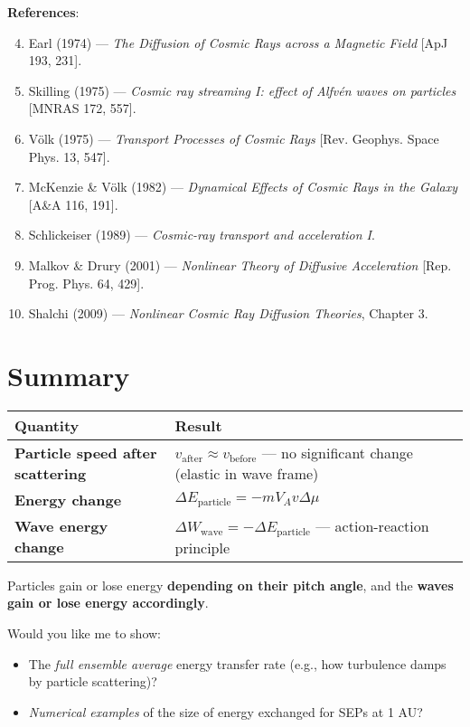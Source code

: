 \medskip
\noindent
\textbf{References}:
\begin{enumerate}
    \setcounter{enumi}{3}
    \item Earl (1974) --- \textit{The Diffusion of Cosmic Rays across a Magnetic Field} [ApJ 193, 231].
    \item Skilling (1975) --- \textit{Cosmic ray streaming I: effect of Alfvén waves on particles} [MNRAS 172, 557].
    \item Völk (1975) --- \textit{Transport Processes of Cosmic Rays} [Rev. Geophys. Space Phys. 13, 547].
    \item McKenzie \& Völk (1982) --- \textit{Dynamical Effects of Cosmic Rays in the Galaxy} [A\&A 116, 191].
    \item Schlickeiser (1989) --- \textit{Cosmic-ray transport and acceleration I}.
    \item Malkov \& Drury (2001) --- \textit{Nonlinear Theory of Diffusive Acceleration} [Rep. Prog. Phys. 64, 429].
    \item Shalchi (2009) --- \textit{Nonlinear Cosmic Ray Diffusion Theories}, Chapter 3.
\end{enumerate}

\hrulefill

\section*{\texorpdfstring{ \textbf{Summary}}{}}

\begin{center}
\begin{tabular}{@{}lll@{}}
\toprule
\textbf{Quantity} & \textbf{Result} \\
\midrule
\textbf{Particle speed after scattering} & $v_{\text{after}} \approx v_{\text{before}}$ --- no significant change (elastic in wave frame) \\
\textbf{Energy change} & $\Delta E_{\text{particle}} = - m V_A v \Delta \mu$ \\
\textbf{Wave energy change} & $\Delta W_{\text{wave}} = - \Delta E_{\text{particle}}$ --- action-reaction principle \\
\bottomrule
\end{tabular}
\end{center}

Particles gain or lose energy \textbf{depending on their pitch angle}, and the \textbf{waves gain or lose energy accordingly}.

\hrulefill

Would you like me to show:
\begin{itemize}
    \item The \textit{full ensemble average} energy transfer rate (e.g., how turbulence damps by particle scattering)?
    \item \textit{Numerical examples} of the size of energy exchanged for SEPs at 1 AU?
\end{itemize}



